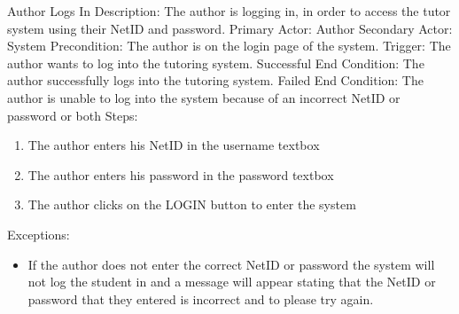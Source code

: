     \begin{section}{Author Logs In}
        Description: The author is logging in, in order to access the tutor system using their NetID and password. \newline
        Primary Actor: Author \newline
        Secondary Actor: System \newline
        Precondition: The author is on the login page of the system. \newline
        Trigger: The author wants to log into the tutoring system. \newline
        Successful End Condition: The author successfully logs into the tutoring system. \newline
        Failed End Condition:  The author is unable to log into the system because of an incorrect NetID or password or both \newline
        \newline
        Steps:
        \begin{enumerate}
            \item{The author enters his NetID in the username textbox}
            \item{The author enters his password in the password textbox}
            \item{The author clicks on the LOGIN button to enter the system}
        \end{enumerate}
        Exceptions:
        \begin{itemize}
            \item{If the author does not enter the correct NetID or password 
            the system will not log the student in and a message will appear stating 
            that the NetID or password that they entered is incorrect and to please try again.}
        \end{itemize}
    \end{section}
  
  
    
